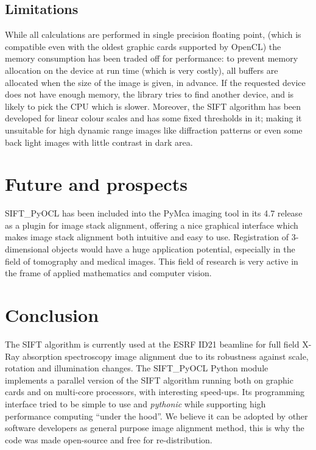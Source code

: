 \documentclass[preprint]{iucr}
\begin{document}
\subsection{Limitations}
While all calculations are performed in single precision floating point,
(which is compatible even with the oldest graphic cards supported by OpenCL)
the memory consumption has been traded off for performance: to prevent memory
allocation on the device at run time (which is very costly), all buffers are
allocated when the size of the image is given, in advance. If the
requested device does not have enough memory, the library tries to find another
device, and is likely to pick the CPU which is slower.
Moreover, the SIFT algorithm has been developed for linear colour scales and
has some fixed thresholds in it; making it unsuitable for high dynamic
range images like diffraction patterns or even some back light images with
little contrast in dark area.


\section{Future and prospects}

SIFT\_PyOCL has been included into the PyMca imaging tool \cite{pymca} in its
4.7 release as a plugin for image stack alignment, offering a nice graphical
interface which makes image stack alignment both intuitive and easy to use.
Registration of 3-dimensional objects would have a huge application potential,
especially in the field of tomography and medical images.
This field of research is very active in the frame of applied mathematics and
computer vision.


\section{Conclusion}

The SIFT algorithm is currently used at the ESRF ID21 beamline for full field
X-Ray absorption spectroscopy image alignment due to its robustness against
scale, rotation and illumination changes.
The SIFT\_PyOCL Python module implements a parallel version of the SIFT
algorithm running both on graphic cards and on multi-core processors, with
interesting speed-ups.
Its programming interface tried to be simple to use and \emph{pythonic} while
supporting high performance computing ``under the hood''.
We believe it can be adopted by other software developers as general purpose
image alignment method, this is why the code was made open-source and free for
re-distribution.
\end{document}
